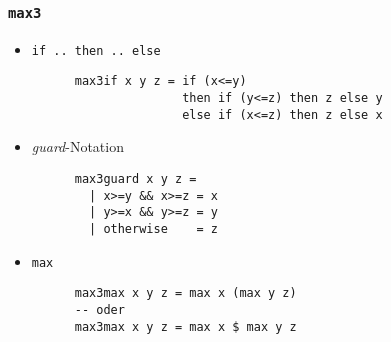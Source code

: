 \documentclass{beamer}
\begin{document}
\begin{frame}[fragile]
  \frametitle{\lstinline{max3}}
  \begin{itemize}
  \item \lstinline{if .. then .. else}
    \pause
    \begin{lstlisting}
      max3if x y z = if (x<=y)
                     then if (y<=z) then z else y
                     else if (x<=z) then z else x
    \end{lstlisting}
    \pause
  \item \emph{guard}-Notation
    \pause
    \begin{lstlisting}
      max3guard x y z =
        | x>=y && x>=z = x
        | y>=x && y>=z = y
        | otherwise    = z
    \end{lstlisting}
    \pause
  \item \lstinline{max}
    \pause
    \begin{lstlisting}
      max3max x y z = max x (max y z)
      -- oder
      max3max x y z = max x $ max y z
    \end{lstlisting}
  \end{itemize}
\end{frame}
\end{document}
